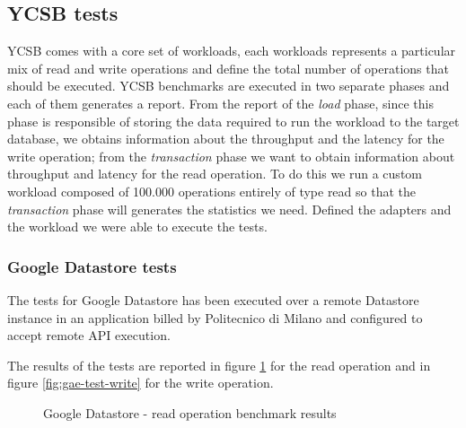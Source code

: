 \subsection{YCSB tests}
YCSB comes with a core set of workloads, each workloads represents a particular mix of read and write operations and define the total number of operations that should be executed. 
\noindent YCSB benchmarks are executed in two separate phases and each of them generates a report. From the report of the \textit{load} phase, since this phase is responsible of storing the data required to run the workload to the target database, we obtains information about the throughput and the latency for the write operation; from the \textit{transaction} phase we want to obtain information about throughput and latency for the read operation. To do this we run a custom workload composed of 100.000 operations entirely of type read so that the \textit{transaction} phase will generates the statistics we need.
\noindent Defined the adapters and the workload we were able to execute the tests.

\subsubsection{Google Datastore tests}
The tests for Google Datastore has been executed over a remote Datastore instance in an application billed by Politecnico di Milano and configured to accept remote API execution.

\noindent The results of the tests are reported in figure \ref{fig:gae-test-read} for the read operation and in figure \ref{fig:gae-test-write} for the write operation.
 
\begin{figure}[tbh]
  \centering
  \qquad
  \caption{Google Datastore - read operation benchmark results}
  \label{fig:gae-test-read}
\end{figure} 

